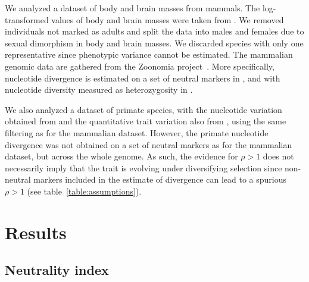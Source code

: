 \documentclass{article}
\newcommand{\NI}{\rho}
\begin{document}
We analyzed a dataset of body and brain masses from mammals.
The log-transformed values of body and brain masses were taken from \citet{tsuboi_breakdown_2018}.
We removed individuals not marked as adults and split the data into males and females due to sexual dimorphism in body and brain masses.
We discarded species with only one representative since phenotypic variance cannot be estimated.
The mammalian genomic data are gathered from the Zoonomia project~\citep{genereux_comparative_2020}.
More specifically, nucleotide divergence is estimated on a set of neutral markers in \citet{foley_genomic_2023}, and with nucleotide diversity measured as heterozygosity in \citet{wilder_contribution_2023}.

We also analyzed a dataset of primate species, with the nucleotide variation obtained from \citet{kuderna_global_2023} and the quantitative trait variation also from \citet{tsuboi_breakdown_2018}, using the same filtering as for the mammalian dataset.
However, the primate nucleotide divergence was not obtained on a set of neutral markers as for the mammalian dataset, but across the whole genome.
As such, the evidence for $\NI > 1$ does not necessarily imply that the trait is evolving under diversifying selection since non-neutral markers included in the estimate of divergence can lead to a spurious $\NI > 1$ (see table~\ref{table:assumptions}).

\section*{Results}\label{sec:results}

\subsection*{Neutrality index}
\end{document}
